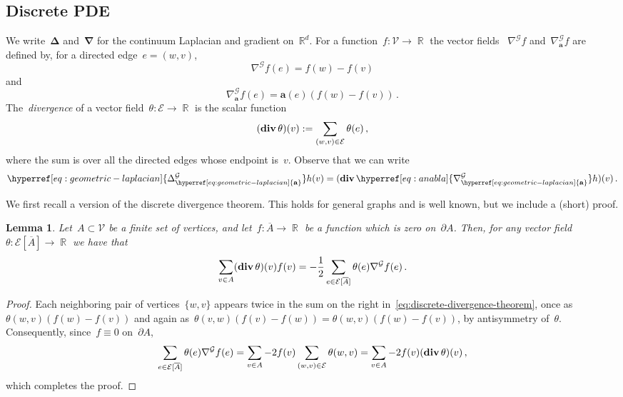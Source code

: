 \documentclass[12pt]{amsart}
\numberwithin{equation}{section}
\DeclareMathOperator{\R}{\mathbb{R}}
\newtheorem{lemma}[theorem]{Lemma}
\renewcommand{\div}{\mathop{\bf div}}
\newcommand*{\Rd}{\ensuremath{\mathbb{R}^d}}
\newcommand{\V}{\mathcal{V}}
\newcommand{\E}{\mathcal{E}}
\newcommand{\CLap}{\boldsymbol{\Delta}}
\newcommand{\Cnabla}{\boldsymbol{\nabla}}
\newcommand{\aDelta}{\hyperref[eq:geometric-laplacian]{{\Delta^{\mathcal{G}}_{\cond}}}}
\newcommand{\cond}{\hyperref[eq:geometric-laplacian]{\mathbf{a}}}
\newcommand{\anabla}{\hyperref[eq:anabla]{{\nabla^{\mathcal{G}}_{\cond}}}}
\begin{document}
\subsection{Discrete PDE}
We write~$\CLap$ and~$\Cnabla$ for the continuum Laplacian and gradient on~$\Rd$. For a function~$f : \V \to \R$ the vector fields
~$\nabla^{\mathcal{G}} f$ and~$\anabla f$ are defined by,  for a directed edge~$e = (w,v)$, 
\begin{equation}
	\nabla^{\mathcal{G}} f(e) = f(w) - f(v)	
\end{equation}
and
\begin{equation}
	\label{eq:anabla}
\anabla f(e) = \cond(e)(f(w) - f(v)) \, . 
\end{equation}
 The~\emph{divergence} of a vector field~$\theta:\E \to \R$ is the scalar function 
\begin{equation}
	\label{eq:discrete-divergence}
(\div \theta)(v) := \sum_{ (w,v) \in \E } \theta(e) \, , 
\end{equation}
where the sum is over all the directed edges whose endpoint is~$v$. Observe that we can write 
\[
\aDelta h(v) = (\div \anabla h)(v) \, .  
\]


We first recall a version of the discrete divergence theorem. This holds for general graphs
and is well known, but we include a (short) proof. 
\begin{lemma} \label{lemma:discrete-divergence-theorem}
		Let~$A \subset \V$ be a finite set of vertices, and let~$f: \overline{A} \to \R$ be a function which is
	zero on~$\partial A$. Then, for any vector field~$\theta: \E[\overline{A}] \to \R$ we have that 
	\begin{equation}
		\label{eq:discrete-divergence-theorem}
	\sum_{v \in A} (\div \theta)(v) f(v) = - \frac{1}{2} \sum_{e \in \E[\overline{A}]} \theta(e) \nabla^{\mathcal{G}} f(e) \, . 
\end{equation}
\end{lemma}
\begin{proof}
	Each neighboring pair of vertices~$\{w,v\}$ appears twice in the sum on the right in~\eqref{eq:discrete-divergence-theorem}, once as~$\theta(w,v) (f(w) - f(v))$
	and again as~$\theta(v,w) (f(v)-f(w)) = \theta(w,v) (f(w)-f(v))$, by antisymmetry of~$\theta$. Consequently, since~$f \equiv 0$ on~$\partial A$, 
	\[
		\sum_{e \in \E[\overline{A}]} \theta(e) \nabla^{\mathcal{G}} f(e) =  \sum_{v \in A} -2 f(v) \sum_{(w,v) \in \E} \theta(w,v)  
		= \sum_{v \in A} -2 f(v) (\div \theta)(v) \, , 
	\]
	which completes the proof.
\end{proof}
\end{document}
